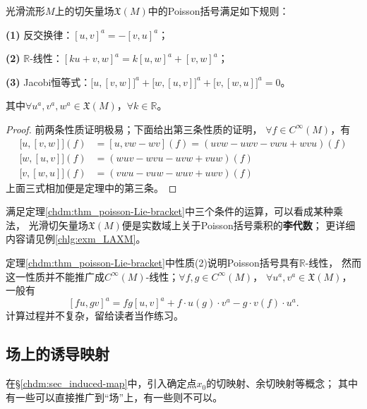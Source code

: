 \begin{theorem}\label{chdm:thm_poisson-Lie-bracket}
    光滑流形$M$上的切矢量场$\mathfrak{X}(M)$中的Poisson括号满足如下规则：
    
    {\bfseries (1)} 反交换律：$\left[u,v\right]^a = -\left[v,u\right]^a$；
    
    {\bfseries (2)} $\mathbb{R}$-线性：$\left[k u+ v,w\right]^a = k \left[u,w\right]^a +\left[v,w\right]^a$；
    
    {\bfseries (3)} Jacobi恒等式：$\bigl[u, [v,w]\bigr]^a+\bigl[w, [u,v]\bigr]^a+\bigl[v, [w,u]\bigr]^a=0$。
    
    其中$\forall u^a,v^a,w^a \in \mathfrak{X}(M)$，$ \forall k \in \mathbb{R}$。
\end{theorem}
\begin{proof}
    前两条性质证明极易；下面给出第三条性质的证明，
    $\forall f\in C^\infty (M)$，有
    \begin{align*}
        \bigl[u, [v,w]\bigr](f) & =[u, vw-wv](f)=(uvw-uwv-vwu+wvu)(f) \\
        \bigl[w, [u,v]\bigr](f) & =(wuv-wvu-uvw+vuw)(f) \\
        \bigl[v, [w,u]\bigr](f) & =(vwu-vuw-wuv+uwv)(f)
    \end{align*}
    上面三式相加便是定理中的第三条。
\end{proof}
满足定理\ref{chdm:thm_poisson-Lie-bracket}中三个条件的运算，可以看成某种乘法，
光滑切矢量场$\mathfrak{X}(M)$便是实数域上关于Poisson括号乘积的\textbf{李代数}；
更详细内容请见例\ref{chlg:exm_LAXM}。 %

定理\ref{chdm:thm_poisson-Lie-bracket}中性质(2)说明Poisson括号具有$\mathbb{R}$-线性，
然而这一性质并不能推广成$C^\infty(M)$-线性；$\forall f,g\in C^\infty (M)$，
$\forall u^a,v^a \in \mathfrak{X}(M)$，一般有
\begin{equation}\label{chdm:eqn_fg-PoissonBracket}
    [f u, g v]^a = fg[u,v]^a+f\cdot u(g)\cdot v^a -g\cdot v(f)\cdot u^a .
\end{equation}
计算过程并不复杂，留给读者当作练习。



\subsection{场上的诱导映射}\label{chdm:sec_induced-map-on-fields}

在\S\ref{chdm:sec_induced-map}中，引入确定点$x_0$的切映射、余切映射等概念；
其中有一些可以直接推广到“场”上，有一些则不可以。

